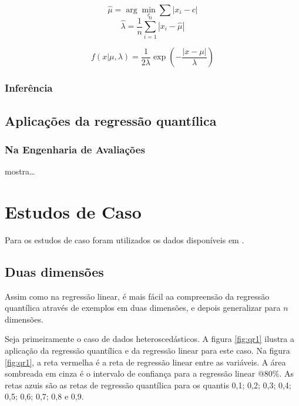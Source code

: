 \documentclass[a4paper, 12pt]{article}
\begin{document}
\[\hat \mu = \arg\min_c \sum |x_i - c|\]
\[\hat \lambda = \frac{1}{n} \sum_{i=1}^n |x_i - \hat \mu|\]

\[f(x|\mu, \lambda) = \frac{1}{2 \lambda} \exp \left ( -\frac{|x - \mu|}{\lambda}\right )\]

\hypertarget{inferencia}{%
\subsubsection{Inferência}\label{inferencia}}

\hypertarget{aplicacoes-da-regressao-quantilica}{%
\subsection{Aplicações da regressão
quantílica}\label{aplicacoes-da-regressao-quantilica}}

\hypertarget{na-engenharia-de-avaliacoes}{%
\subsubsection{Na Engenharia de
Avaliações}\label{na-engenharia-de-avaliacoes}}

\textcite{Zietz} mostra\ldots{}

\hypertarget{estudos-de-caso}{%
\section{Estudos de Caso}\label{estudos-de-caso}}

Para os estudos de caso foram utilizados os dados disponíveis em
\textcite{hochheim}.

\hypertarget{duas-dimensoes}{%
\subsection{Duas dimensões}\label{duas-dimensoes}}

Assim como na regressão linear, é mais fácil aa compreensão da regressão
quantílica através de exemplos em duas dimensões, e depois generalizar
para \(n\) dimensões.

Seja primeiramente o caso de dados heteroscedásticos. A figura
\ref{fig:qr1} ilustra a aplicação da regressão quantílica e da regressão
linear para este caso. Na figura \ref{fig:qr1}, a reta vermelha é a reta
de regressão linear entre as variáveis. A área sombreada em cinza é o
intervalo de confiança para a regressão linear @80\%. As retas azuis são
as retas de regressão quantílica para os quantis 0,1; 0,2; 0,3; 0,4;
0,5; 0,6; 0,7; 0,8 e 0,9.
\end{document}
